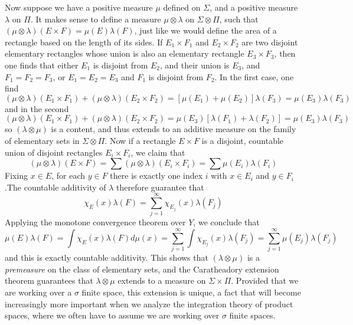 Now suppose we have a positive measure $\mu$ defined on $\Sigma$, and a positive measure $\lambda$ on $\Pi$. It makes sense to define a measure $\mu \otimes \lambda$ on $\Sigma \otimes \Pi$, such that $(\mu \otimes \lambda)(E \times F) = \mu(E) \lambda(F)$, just like we would define the area of a rectangle based on the length of its sides. If $E_1 \times F_1$ and $E_2 \times F_2$ are two disjoint elementary rectangles whose union is also an elementary rectangle $E_3 \times F_3$, then one finds that either $E_1$ is disjoint from $E_2$, and their union is $E_3$, and $F_1 = F_2 = F_3$, or $E_1 = E_2 = E_3$ and $F_1$ is disjoint from $F_2$. In the first case, one find
%
\[ (\mu \otimes \lambda)(E_1 \times F_1) + (\mu \otimes \lambda)(E_2 \times F_2) = [\mu(E_1) + \mu(E_2)] \lambda(F_3) = \mu(E_3) \lambda(F_3) \]
%
and in the second
%
\[ (\mu \otimes \lambda)(E_1 \times F_1) + (\mu \otimes \lambda)(E_2 \times F_2) = \mu(E_3) [\lambda(F_1) + \lambda(F_2)] = \mu(E_3) \lambda(F_3) \]
%
so $(\lambda \otimes \mu)$ is a content, and thus extends to an additive measure on the family of elementary sets in $\Sigma \otimes \Pi$. Now if a rectangle $E \times F$ is a disjoint, countable union of disjoint rectangles $E_i \times F_i$, we claim that
%
\[ (\mu \otimes \lambda)(E \times F) = \sum (\mu \otimes \lambda)(E_i \times F_i) = \sum \mu(E_i) \lambda(F_i) \]
%
Fixing $x \in E$, for each $y \in F$ there is exactly one index $i$ with $x \in E_i$ and $y \in F_i$.The countable additivity of $\lambda$ therefore guarantee that
%
\[ \chi_E(x) \lambda(F) = \sum_{j = 1}^\infty \chi_{E_j}(x) \lambda(F_j) \]
%
Applying the monotone convergence theorem over $Y$, we conclude that
%
\[ \mu(E) \lambda(F) = \int \chi_E(x) \lambda(F) d\mu(x) = \sum_{j = 1}^\infty \int \chi_{E_j}(x) \lambda(F_j) = \sum_{j = 1}^\infty \mu(E_j) \lambda(F_j) \]
%
and this is exactly countable additivity. This shows that $(\lambda \otimes \mu)$ is a {\it premeasure} on the class of elementary sets, and the Caratheadory extension theorem guarantees that $\lambda \otimes \mu$ extends to a measure on $\Sigma \times \Pi$. Provided that we are working over a $\sigma$ finite space, this extension is unique, a fact that will become increasingly more important when we analyze the integration theory of product spaces, where we often have to assume we are working over $\sigma$ finite spaces.

